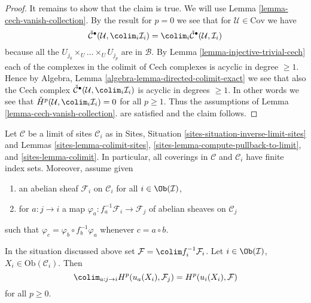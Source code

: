 \begin{proof}
\medskip\noindent
It remains to show that the claim is true. We will use
Lemma \ref{lemma-cech-vanish-collection}.
By the result for $p = 0$ we see that for $\mathcal{U} \in \text{Cov}$
we have
$$
\check{\mathcal{C}}^\bullet(\mathcal{U}, \colim_i \mathcal{I}_i)
=
\colim_i \check{\mathcal{C}}^\bullet(\mathcal{U}, \mathcal{I}_i)
$$
because all the $U_{j_0} \times_U \ldots \times_U U_{j_p}$
are in $\mathcal{B}$. By
Lemma \ref{lemma-injective-trivial-cech}
each of the complexes in the colimit of Cech complexes is
acyclic in degree $\geq 1$. Hence by
Algebra, Lemma \ref{algebra-lemma-directed-colimit-exact}
we see that also the Cech complex
$\check{\mathcal{C}}^\bullet(\mathcal{U}, \colim_i \mathcal{I}_i)$
is acyclic in degrees $\geq 1$. In other words we see that
$\check{H}^p(\mathcal{U}, \colim_i \mathcal{I}_i) = 0$
for all $p \geq 1$. Thus the assumptions of
Lemma \ref{lemma-cech-vanish-collection}.
are satisfied and the claim follows.
\end{proof}

\noindent
Let $\mathcal{C}$ be a limit of sites $\mathcal{C}_i$ as in
Sites, Situation \ref{sites-situation-inverse-limit-sites} and
Lemmas \ref{sites-lemma-colimit-sites},
\ref{sites-lemma-compute-pullback-to-limit}, and
\ref{sites-lemma-colimit}.
In particular, all coverings
in $\mathcal{C}$ and $\mathcal{C}_i$ have finite index sets.
Moreover, assume given
\begin{enumerate}
\item an abelian sheaf $\mathcal{F}_i$ on $\mathcal{C}_i$ for all
$i \in \Ob(\mathcal{I})$,
\item for $a : j \to i$ a map
$\varphi_a : f_a^{-1}\mathcal{F}_i \to \mathcal{F}_j$
of abelian sheaves on $\mathcal{C}_j$
\end{enumerate}
such that $\varphi_c = \varphi_b \circ f_b^{-1}\varphi_a$
whenever $c = a \circ b$.

\begin{lemma}
\label{lemma-colimit}
In the situation discussed above set
$\mathcal{F} = \colim f_i^{-1}\mathcal{F}_i$.
Let $i \in \Ob(\mathcal{I})$, $X_i \in \text{Ob}(\mathcal{C}_i)$. Then
$$
\colim_{a : j \to i} H^p(u_a(X_i), \mathcal{F}_j) =
H^p(u_i(X_i), \mathcal{F})
$$
for all $p \geq 0$.
\end{lemma}

